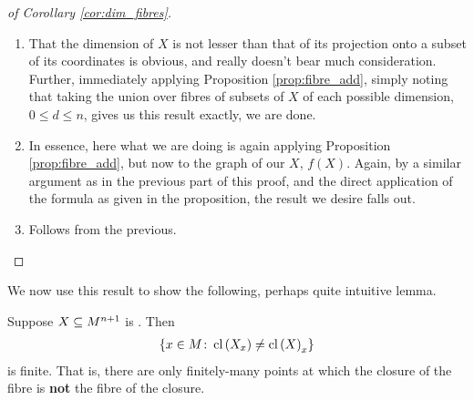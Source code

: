 \begin{proof}[of Corollary \ref{cor:dim_fibres}]
  \leavevmode
  \begin{enumerate}
    \item That the dimension of $X$ is not lesser than that of its projection onto a subset of its coordinates is obvious, and really doesn't bear much consideration. Further, immediately applying Proposition \ref{prop:fibre_add}, simply noting that taking the union over fibres of subsets of $X$ of each possible dimension, $0 \leq d \leq n$, gives us this result exactly, we are done.

    \item In essence, here what we are doing is again applying Proposition \ref{prop:fibre_add}, but now to the graph of our $X$, $f(X)$. Again, by a similar argument as in the previous part of this proof, and the direct application of the formula as given in the proposition, the result we desire falls out.

    \item Follows from the previous.
    \end{enumerate}
\end{proof}


\begin{exercise}
  \label{exc:dim_exc}
\end{exercise}


We now use this result to show the following, perhaps quite intuitive lemma.
\begin{lemma}
  \label{lemma:closures_fibres}
  Suppose $X \subseteq M^{n+1}$ is . Then
  \begin{align*}
    \left\{ x \in M \colon \operatorname{cl}\left(X_x\right) \neq \operatorname{cl}\left(X\right)_x \right\}
  \end{align*}
  is finite. That is, there are only finitely-many points at which the closure of the fibre is \textbf{not} the fibre of the closure.
\end{lemma}

